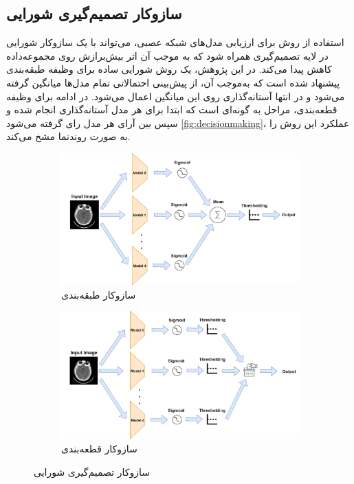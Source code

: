 \subsection{سازوکار تصمیم‌گیری شورایی}
\label{ch2-decision-policy}
استفاده از روش
برای ارزیابی مدل‌های شبکه‌ عصبی،‌ می‌تواند با یک سازوکار شورایی در لایه تصمیم‌گیری همراه شود که به موجب آن اثر بیش‌برازش روی مجموعه‌داده کاهش پیدا می‌کند. در این پژوهش،‌ یک روش شورایی ساده برای وظیفه طبقه‌بندی پیشنهاد شده است که به‌موجب آن، از پیش‌بینی احتمالاتی تمام مدل‌ها میانگین گرفته می‌شود و در انتها آستانه‌گذاری روی این میانگین اعمال می‌شود. در ادامه برای وظیفه قطعه‌بندی،‌ مراحل به گونه‌ای است که ابتدا برای هر مدل آستانه‌گذاری انجام شده و سپس بین آرای هر مدل رای گرفته می‌شود 
\autoref{fig:decisionmaking}،
عملکرد این روش را به صورت روند‌نما مشخ می‌کند.


\begin{figure}[h!]
		\centering %
		\begin{subfigure}{0.49\textwidth}
			\includegraphics[width=\linewidth]{Images/Chapter2/decision_making.drawio}
			\caption{سازوکار طبقه‌بندی}
			\label{f61}
		\end{subfigure}\hfil %
		\begin{subfigure}{0.49\textwidth}
			\includegraphics[width=\linewidth]{Images/Chapter2/decision_making_seg.drawio}
			\caption{سازوکار قطعه‌بندی}
			\label{f62}
		\end{subfigure}\hfil %

		\caption{سازوکار تصمیم‌گیری شورایی}
		\label{fig:decisionmaking}
\end{figure}

